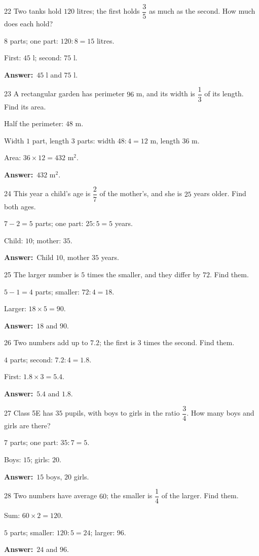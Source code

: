 \documentclass[11pt]{article}
\newif\ifsol \solfalse
\providecommand{\AnsWord}{Đáp số}
\newcommand{\dapso}[1]{\par\textbf{\AnsWord:}\ #1}
\newcommand{\probsol}[1]{%
  \begin{lrbox}{\solmeasure}\begin{minipage}{\dimexpr\linewidth-24pt\relax}#1\end{minipage}\end{lrbox}%
  \ifsol
    \begin{solbox}#1\end{solbox}%
  \else
    \setlength{\solht}{\dimexpr\ht\solmeasure+\dp\solmeasure+0.85cm\relax}%
    \ifdim\solht<1.35cm\setlength{\solht}{1.35cm}\fi
    \begin{tcolorbox}[colback=white,colframe=Line,boxrule=0.8pt,arc=5pt,
      left=8pt,right=8pt,top=4pt,bottom=4pt,height=\solht]{\footnotesize\color{Slate}\itshape\WorkWord}\end{tcolorbox}%
  \fi}
\newcommand{\gap}{\vspace{0.3cm}}
\def\WorkWord{Your work:}
\def\AnsWord{Answer}
\begin{document}
\gap
\begin{probbox}{22}{\relax}
Two tanks hold $120$ litres; the first holds $\dfrac35$ as much as the second. How much does each hold?
\end{probbox}
\probsol{
$8$ parts; one part: $120:8=15$ litres.\par First: $45$ l; second: $75$ l.
\dapso{$45$ l and $75$ l.}}
\gap
\begin{probbox}{23}{\relax}
A rectangular garden has perimeter $96$ m, and its width is $\dfrac13$ of its length. Find its area.
\end{probbox}
\probsol{
Half the perimeter: $48$ m.\par Width $1$ part, length $3$ parts: width $48:4=12$ m, length $36$ m.\par Area: $36\times12=432$ m$^2$.
\dapso{$432$ m$^2$.}}
\gap
\begin{probbox}{24}{\relax}
This year a child's age is $\dfrac27$ of the mother's, and she is $25$ years older. Find both ages.
\end{probbox}
\probsol{
$7-2=5$ parts; one part: $25:5=5$ years.\par Child: $10$; mother: $35$.
\dapso{Child $10$, mother $35$ years.}}
\gap
\begin{probbox}{25}{\relax}
The larger number is $5$ times the smaller, and they differ by $72$. Find them.
\end{probbox}
\probsol{
$5-1=4$ parts; smaller: $72:4=18$.\par Larger: $18\times5=90$.
\dapso{$18$ and $90$.}}
\gap
\begin{probbox}{26}{\relax}
Two numbers add up to $7.2$; the first is $3$ times the second. Find them.
\end{probbox}
\probsol{
$4$ parts; second: $7.2:4=1.8$.\par First: $1.8\times3=5.4$.
\dapso{$5.4$ and $1.8$.}}
\gap
\begin{probbox}{27}{\relax}
Class 5E has $35$ pupils, with boys to girls in the ratio $\dfrac34$. How many boys and girls are there?
\end{probbox}
\probsol{
$7$ parts; one part: $35:7=5$.\par Boys: $15$; girls: $20$.
\dapso{$15$ boys, $20$ girls.}}
\gap
\begin{probbox}{28}{\relax}
Two numbers have average $60$; the smaller is $\dfrac14$ of the larger. Find them.
\end{probbox}
\probsol{
Sum: $60\times2=120$.\par $5$ parts; smaller: $120:5=24$; larger: $96$.
\dapso{$24$ and $96$.}}
\end{document}
